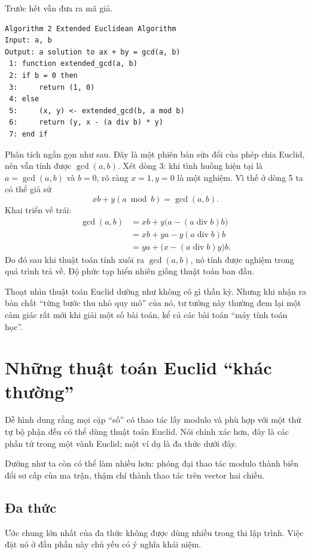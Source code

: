 \documentclass[11pt]{article}
\begin{document}
Trước hết vẫn đưa ra mã giả.

\begin{verbatim}
Algorithm 2 Extended Euclidean Algorithm
Input: a, b
Output: a solution to ax + by = gcd(a, b)
 1: function extended_gcd(a, b)
 2: if b = 0 then
 3:     return (1, 0)
 4: else
 5:     (x, y) <- extended_gcd(b, a mod b)
 6:     return (y, x - (a div b) * y)
 7: end if
\end{verbatim}

Phân tích ngắn gọn như sau. Đây là một phiên bản sửa đổi của phép chia Euclid,
nên vẫn tính được $\gcd(a,b)$. Xét dòng 3: khi tình huống hiện tại là
$a=\gcd(a,b)$ và $b=0$, rõ ràng $x=1,y=0$ là một nghiệm. Vì thế ở dòng 5 ta có
thể giả sử
\[
  x b+y(a\bmod b)=\gcd(a,b).
\]
Khai triển vế trái:
\[
\begin{aligned}
  \gcd(a,b)
    &=xb+y\bigl(a-(a\operatorname{div} b)b\bigr)\\
    &=xb+ya-y(a\operatorname{div} b)b\\
    &=y a+\bigl(x-(a\operatorname{div} b)y\bigr)b.
\end{aligned}
\]
Do đó sau khi thuật toán tính xuôi ra $\gcd(a,b)$, nó tính được nghiệm trong
quá trình trả về. Độ phức tạp hiển nhiên giống thuật toán ban đầu.

Thoạt nhìn thuật toán Euclid dường như không có gì thần kỳ. Nhưng khi nhận ra
bản chất ``từng bước thu nhỏ quy mô'' của nó, tư tưởng này thường đem lại một
cảm giác rất mới khi giải một số bài toán, kể cả các bài toán ``máy tính toán
học''.

\section{Những thuật toán Euclid ``khác thường''}

Dễ hình dung rằng mọi cặp ``số'' có thao tác lấy modulo và phù hợp với một thứ
tự bộ phận đều có thể dùng thuật toán Euclid. Nói chính xác hơn, đây là các
phần tử trong một vành Euclid; một ví dụ là đa thức dưới đây.

Dường như ta còn có thể làm nhiều hơn: phóng đại thao tác modulo thành biến
đổi sơ cấp của ma trận, thậm chí thành thao tác trên vector hai chiều.

\subsection{Đa thức}

Ước chung lớn nhất của đa thức không được dùng nhiều trong thi lập trình. Việc
đặt nó ở đầu phần này chủ yếu có ý nghĩa khái niệm.
\end{document}
